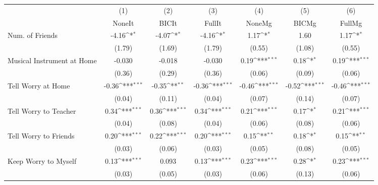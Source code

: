 {
\def\sym#1{\ifmmode^{#1}\else\(^{#1}\)\fi}
\begin{tabular}{l*{6}{c}}
\toprule
            &\multicolumn{1}{c}{(1)}&\multicolumn{1}{c}{(2)}&\multicolumn{1}{c}{(3)}&\multicolumn{1}{c}{(4)}&\multicolumn{1}{c}{(5)}&\multicolumn{1}{c}{(6)}\\
            &\multicolumn{1}{c}{NoneIt}&\multicolumn{1}{c}{BICIt}&\multicolumn{1}{c}{FullIt}&\multicolumn{1}{c}{NoneMg}&\multicolumn{1}{c}{BICMg}&\multicolumn{1}{c}{FullMg}\\
\midrule
Num. of Friends&       -4.16\sym{*}  &       -4.07\sym{*}  &       -4.16\sym{*}  &        1.17\sym{*}  &        1.60         &        1.17\sym{*}  \\
            &      (1.79)         &      (1.69)         &      (1.79)         &      (0.55)         &      (1.08)         &      (0.55)         \\
\addlinespace
Musical Instrument at Home&      -0.030         &      -0.018         &      -0.030         &        0.19\sym{***}&        0.18\sym{*}  &        0.19\sym{***}\\
            &      (0.36)         &      (0.29)         &      (0.36)         &      (0.06)         &      (0.09)         &      (0.06)         \\
\addlinespace
Tell Worry at Home&       -0.36\sym{***}&       -0.35\sym{**} &       -0.36\sym{***}&       -0.46\sym{***}&       -0.52\sym{***}&       -0.46\sym{***}\\
            &      (0.04)         &      (0.11)         &      (0.04)         &      (0.07)         &      (0.14)         &      (0.07)         \\
\addlinespace
Tell Worry to Teacher&        0.34\sym{***}&        0.36\sym{***}&        0.34\sym{***}&        0.21\sym{***}&        0.17\sym{*}  &        0.21\sym{***}\\
            &      (0.04)         &      (0.08)         &      (0.04)         &      (0.06)         &      (0.08)         &      (0.06)         \\
\addlinespace
Tell Worry to Friends&        0.20\sym{***}&        0.22\sym{***}&        0.20\sym{***}&        0.15\sym{**} &        0.18\sym{*}  &        0.15\sym{**} \\
            &      (0.03)         &      (0.06)         &      (0.03)         &      (0.05)         &      (0.08)         &      (0.05)         \\
\addlinespace
Keep Worry to Myself&        0.13\sym{***}&       0.093         &        0.13\sym{***}&        0.23\sym{***}&        0.28\sym{*}  &        0.23\sym{***}\\
            &      (0.03)         &      (0.05)         &      (0.03)         &      (0.06)         &      (0.13)         &      (0.06)         \\
\bottomrule
\end{tabular}
}
